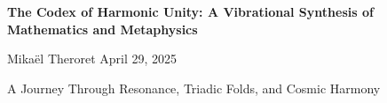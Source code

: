 \documentclass[a4paper]{article}
\begin{document}
\begin{titlepage}
    \centering
    \vspace*{2cm}
    {\color{gold}\Huge\bfseries The Codex of Harmonic Unity: A Vibrational Synthesis of Mathematics and Metaphysics\par}
    \vspace{1cm}
    {\color{codexwhite}\Large Mikaël Theroret \hfill April 29, 2025\par}
    \vspace{2cm}
    {\color{codexwhite}\large A Journey Through Resonance, Triadic Folds, and Cosmic Harmony\par}
    \vfill
\end{titlepage}
\end{document}
